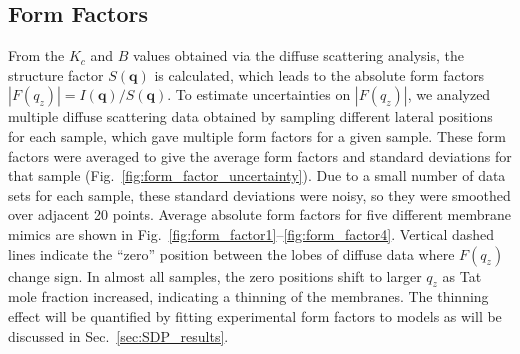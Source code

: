 \subsection{Form Factors}\label{sec:form_factors_results}
From the $K_c$ and $B$ values obtained via the diffuse scattering analysis,
the structure factor $S(\mathbf{q})$ is calculated, which leads to
the absolute form factors $|F(q_z)|=I(\mathbf{q})/S(\mathbf{q})$. 
To estimate uncertainties on $|F(q_z)|$, we analyzed multiple diffuse 
scattering data obtained by sampling different lateral positions for each sample,
which gave multiple form factors for a given sample.
These form factors were averaged to give the average form factors
and standard deviations for that sample (Fig.~\ref{fig:form_factor_uncertainty}).
Due to a small number of data sets for each sample, these standard
deviations were noisy, so they were smoothed over adjacent 20 points.
Average absolute form factors for five different membrane mimics are shown in 
Fig.~\ref{fig:form_factor1}--\ref{fig:form_factor4}. 
Vertical dashed lines indicate the ``zero'' position between the lobes of diffuse data 
where $F(q_z)$ change sign. In almost all samples, the zero positions shift to larger
$q_z$ as Tat mole fraction increased, indicating a thinning of the membranes. The thinning effect will be
quantified by fitting experimental form factors to models as will be discussed in
Sec.~\ref{sec:SDP_results}.


